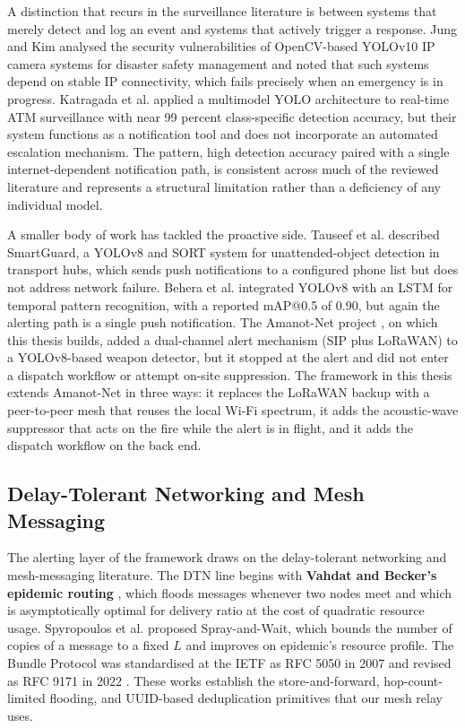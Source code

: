 A distinction that recurs in the surveillance literature is between systems that merely detect and log an event and systems that actively trigger a response. Jung and Kim \cite{jung2025opencv} analysed the security vulnerabilities of OpenCV-based YOLOv10 IP camera systems for disaster safety management and noted that such systems depend on stable IP connectivity, which fails precisely when an emergency is in progress. Katragada et al. \cite{katragada2023atm} applied a multimodel YOLO architecture to real-time ATM surveillance with near 99 percent class-specific detection accuracy, but their system functions as a notification tool and does not incorporate an automated escalation mechanism. The pattern, high detection accuracy paired with a single internet-dependent notification path, is consistent across much of the reviewed literature and represents a structural limitation rather than a deficiency of any individual model.

A smaller body of work has tackled the proactive side. Tauseef et al. \cite{tauseef2024smartguard} described SmartGuard, a YOLOv8 and SORT system for unattended-object detection in transport hubs, which sends push notifications to a configured phone list but does not address network failure. Behera et al. \cite{behera2025lstm} integrated YOLOv8 with an LSTM for temporal pattern recognition, with a reported mAP@0.5 of 0.90, but again the alerting path is a single push notification. The Amanot-Net project \cite{amanotnet2026}, on which this thesis builds, added a dual-channel alert mechanism (SIP plus LoRaWAN) to a YOLOv8-based weapon detector, but it stopped at the alert and did not enter a dispatch workflow or attempt on-site suppression. The framework in this thesis extends Amanot-Net in three ways: it replaces the LoRaWAN backup with a peer-to-peer mesh that reuses the local Wi-Fi spectrum, it adds the acoustic-wave suppressor that acts on the fire while the alert is in flight, and it adds the dispatch workflow on the back end.

\subsection{Delay-Tolerant Networking and Mesh Messaging}

The alerting layer of the framework draws on the delay-tolerant networking and mesh-messaging literature. The DTN line begins with \textbf{Vahdat and Becker's epidemic routing} \cite{vahdat2000}, which floods messages whenever two nodes meet and which is asymptotically optimal for delivery ratio at the cost of quadratic resource usage. Spyropoulos et al. \cite{spyropoulos2005} proposed Spray-and-Wait, which bounds the number of copies of a message to a fixed $L$ and improves on epidemic's resource profile. The Bundle Protocol was standardised at the IETF as RFC 5050 in 2007 and revised as RFC 9171 in 2022 \cite{rfc5050,rfc9171}. These works establish the store-and-forward, hop-count-limited flooding, and UUID-based deduplication primitives that our mesh relay uses.

